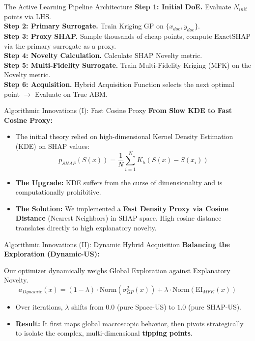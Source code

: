 \documentclass[10pt, aspectratio=169]{beamer}
\begin{document}
\begin{frame}[fragile]{The Active Learning Pipeline Architecture}
  \textbf{Step 1: Initial DoE.} Evaluate $N_{init}$ points via LHS.\\
  \textbf{Step 2: Primary Surrogate.} Train Kriging GP on $\{x_{doe}, y_{doe}\}$.\\
  \textbf{Step 3: Proxy SHAP.} Sample thousands of cheap points, compute ExactSHAP via the primary surrogate as a proxy.\\
  \textbf{Step 4: Novelty Calculation.} Calculate SHAP Novelty metric.\\
  \textbf{Step 5: Multi-Fidelity Surrogate.} Train Multi-Fidelity Kriging (MFK) on the Novelty metric.\\
  \textbf{Step 6: Acquisition.} Hybrid Acquisition Function selects the next optimal point $\rightarrow$ Evaluate on True ABM.
\end{frame}

\begin{frame}[fragile]{Algorithmic Innovations (I): Fast Cosine Proxy}
  \textbf{From Slow KDE to Fast Cosine Proxy:}
  \begin{itemize}
      \item The initial theory relied on high-dimensional Kernel Density Estimation (KDE) on SHAP values:
      $$p_{SHAP}(S(x)) = \frac{1}{N} \sum_{i=1}^N K_h(S(x) - S(x_i))$$
      \item \textbf{The Upgrade:} KDE suffers from the curse of dimensionality and is computationally prohibitive.
      \item \textbf{The Solution:} We implemented a \textbf{Fast Density Proxy via Cosine Distance} (Nearest Neighbors) in SHAP space. High cosine distance translates directly to high explanatory novelty.
  \end{itemize}
\end{frame}

\begin{frame}[fragile]{Algorithmic Innovations (II): Dynamic Hybrid Acquisition}
  \textbf{Balancing the Exploration (Dynamic-US):}
  
  Our optimizer dynamically weighs Global Exploration against Explanatory Novelty.
  $$a_{Dynamic}(x) = (1 - \lambda) \cdot \text{Norm}(\sigma^2_{GP}(x)) + \lambda \cdot \text{Norm}(\text{EI}_{MFK}(x))$$
  
  \begin{itemize}
      \item Over iterations, $\lambda$ shifts from $0.0$ (pure Space-US) to $1.0$ (pure SHAP-US).
      \item \textbf{Result:} It first maps global macroscopic behavior, then pivots strategically to isolate the complex, multi-dimensional \textbf{tipping points}.
  \end{itemize}
\end{frame}
\end{document}
